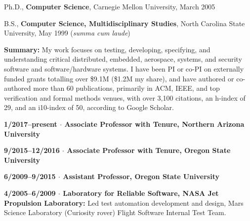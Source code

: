 \documentclass[ComputerScience,10pt]{vita}
\begin{document}
\begin{vita}


\vspace{-0.4in}

\begin{Education}
  \item Ph.D., {\bf Computer Science}, Carnegie Mellon University, March 2005
  \item B.S., {\bf Computer Science, Multidisciplinary Studies}, North Carolina State University, May 1999 (\emph{summa cum laude})
\end{Education}

\begin{Experience}
\item {\bf Summary:} My
  work focuses on testing, developing, specifying, and understanding
  critical distributed, embedded, aerospace, systems, and security
  software and software/hardware systems.  I have been PI or co-PI on externally funded grants
  totalling over \$9.1M (\$1.2M my share), and have authored or
  co-authored more than 60 publications, primarily in ACM, IEEE, and
  top verification and formal methods venues, with over 3,100 citations,
  an h-index of 29, and an i10-index of 50, according to Google
  Scholar.

\item {\bf 1/2017--present $\cdot$ Associate Professor with Tenure, Northern Arizona University}

  \item {\bf 9/2015--12/2016 $\cdot$ Associate Professor with Tenure, Oregon State University}

  \item {\bf 6/2009--9/2015 $\cdot$ Assistant Professor, Oregon State
    University}

  \item {\bf 4/2005--6/2009 $\cdot$ Laboratory for Reliable Software,
    NASA Jet Propulsion Laboratory:} Led test automation development and
    design, Mars Science Laboratory (Curiosity rover) Flight Software
    Internal Test Team.  
\end{Experience}



\end{vita}
\end{document}
